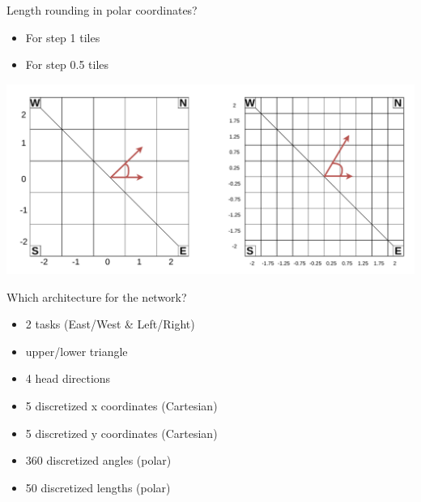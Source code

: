 \documentclass[bigger]{beamer}
\begin{document}
\begin{frame}[label={sec:org24c9b95}]{Length rounding in polar coordinates?}
\begin{itemize}
\item For step 1 tiles
\item For step 0.5 tiles
\end{itemize}
\begin{center}
\includegraphics[width=.9\linewidth]{img/polar-discretized-length.drawio.pdf}
\end{center}
\end{frame}
\begin{frame}[label={sec:org5241fc7}]{Which architecture for the network?}
\begin{itemize}
\item 2 tasks (East/West \& Left/Right)
\item upper/lower triangle
\item 4 head directions
\item 5 discretized x coordinates (Cartesian)
\item 5 discretized y coordinates (Cartesian)
\item 360 discretized angles (polar)
\item 50 discretized lengths (polar)
\end{itemize}
\end{frame}
\end{document}
